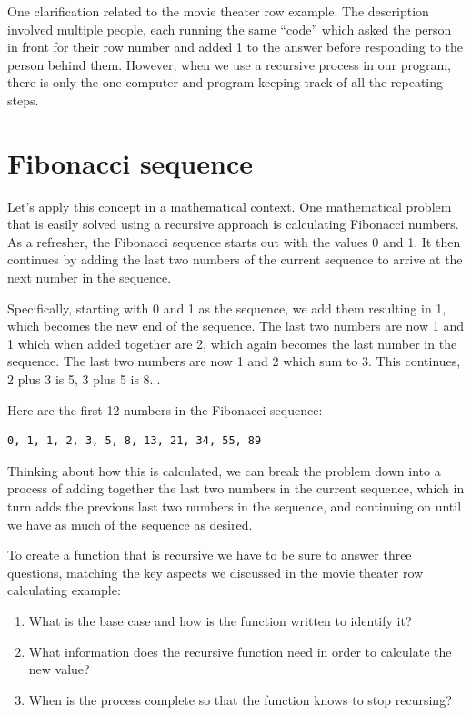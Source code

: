 One clarification related to the movie theater row example. The description involved multiple people, each running the same ``code'' which asked the person in front for their row number and added 1 to the answer before responding to the person behind them. However, when we use a recursive process in our program, there is only the one computer and program keeping track of all the repeating steps.

\section{Fibonacci sequence}    

Let's apply this concept in a mathematical context. One mathematical problem that is easily solved using a recursive approach is calculating Fibonacci numbers. As a refresher, the Fibonacci sequence starts out with the values 0 and 1. It then continues by adding the last two numbers of the current sequence to arrive at the next number in the sequence.

Specifically, starting with 0 and 1 as the sequence, we add them resulting in 1, which becomes the new end of the sequence. The last two numbers are now 1 and 1 which when added together are 2, which again becomes the last number in the sequence. The last two numbers are now 1 and 2 which sum to 3. This continues, 2 plus 3 is 5, 3 plus 5 is 8...

Here are the first 12 numbers in the Fibonacci sequence:

\beforeverb
\begin{verbatim}
0, 1, 1, 2, 3, 5, 8, 13, 21, 34, 55, 89
\end{verbatim}

Thinking about how this is calculated, we can break the problem down into a process of adding together the last two numbers in the current sequence, which in turn adds the previous last two numbers in the sequence, and continuing on until we have as much of the sequence as desired.

To create a function that is recursive we have to be sure to answer three questions, matching the key aspects we discussed in the movie theater row calculating example:

\begin{enumerate}
	\item What is the base case and how is the function written to identify it?
		
	\item What information does the recursive function need in order to calculate the new value?
	
	\item When is the process complete so that the function knows to stop recursing?
\end{enumerate}

